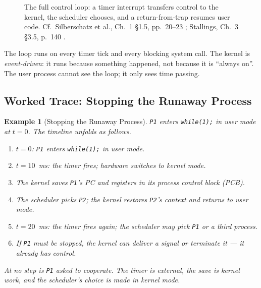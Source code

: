 \documentclass[11pt]{article}
\newtheorem{example}{Example}[section]
\begin{document}
\begin{figure}[h]
  \centering
  \caption{The full control loop: a timer interrupt transfers control to the
  kernel, the scheduler chooses, and a return-from-trap resumes user code.
  Cf.\ Silberschatz et al., Ch.~1 \S1.5, pp.~20--23
  \cite{SilberschatzOSC_operating_system_concepts}; Stallings, Ch.~3 \S3.5,
  p.~140 \cite{StallingsOS_internals_design_principles}.}
  \label{fig:control-loop}
\end{figure}

The loop runs on every timer tick and every blocking system call. The kernel is
\emph{event-driven}: it runs because something happened, not because it is
``always on''. The user process cannot see the loop; it only sees time passing.

\subsection{Worked Trace: Stopping the Runaway Process}

\begin{example}[Stopping the Runaway Process]
\label{ex:runaway}
\texttt{P1} enters \texttt{while(1);} in user mode at $t=0$. The timeline
unfolds as follows.
\begin{enumerate}
  \item $t=0$: \texttt{P1} enters \texttt{while(1);} in user mode.
  \item $t=10$~ms: the timer fires; hardware switches to kernel mode.
  \item The kernel saves \texttt{P1}'s PC and registers in its process control
    block (PCB).
  \item The scheduler picks \texttt{P2}; the kernel restores \texttt{P2}'s
    context and returns to user mode.
  \item $t=20$~ms: the timer fires again; the scheduler may pick \texttt{P1} or
    a third process.
  \item If \texttt{P1} must be stopped, the kernel can deliver a signal or
    terminate it --- it already has control.
\end{enumerate}
At no step is \texttt{P1} asked to cooperate. The timer is external, the save
is kernel work, and the scheduler's choice is made in kernel mode.
\end{example}
\end{document}
